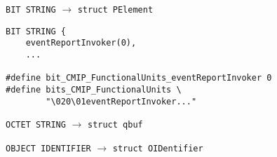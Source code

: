 \begin{bwslide}

\begin{nrtc}
\item	\verb"BIT STRING" $\rightarrow$ \verb"struct PElement"
\begin{verbatim}
BIT STRING {
    eventReportInvoker(0),
    ...

#define	bit_CMIP_FunctionalUnits_eventReportInvoker 0
#define	bits_CMIP_FunctionalUnits \
        "\020\01eventReportInvoker..."
\end{verbatim}

\item	\verb"OCTET STRING" $\rightarrow$ \verb"struct qbuf"

\item	\verb"OBJECT IDENTIFIER" $\rightarrow$ \verb"struct OIDentifier"
\end{nrtc}
\end{bwslide}


%
%
%


%
%
%
%
%


